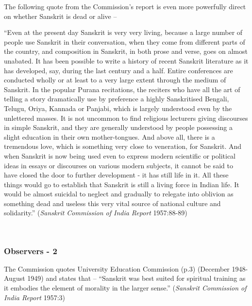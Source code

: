 The following quote from the Commission’s report is even more powerfully direct on whether Sanskrit is dead or alive  – 
\newpage

\begin{myquote}
\eleven
“Even at the present day Sanskrit is very very living, because a large number of people use Sanskrit in their conversation, when they come from different parts of the country, and composition in Sanskrit, in both prose and verse, goes on almost unabated. It has been possible to write a history of recent Sanskrit literature as it has developed, say, during the last century and a half. Entire conferences are conducted wholly or at least to a very large extent through the medium of Sanskrit. In the popular Purana recitations, the reciters who have all the art of telling a story dramatically use by preference a highly Sanskritised Bengali, Telugu, Oriya, Kannada or Panjabi, which is largely understood even by the unlettered masses. It is not uncommon to find religious lecturers giving discourses in simple Sanskrit, and they are generally understood by people possessing a slight education in their own mother-tongues. And above all, there is a tremendous love, which is something very close to veneration, for Sanskrit. And when Sanskrit is now being used even to express modern scientific or political ideas in essays or discourses on various modern subjects, it cannot be said to have closed the door to further development - it has still life in it. All these things would go to establish that Sanskrit is still a living force in Indian life. It would be almost suicidal to neglect and gradually to relegate into oblivion as something dead and useless this very vital source of national culture and solidarity.” \hfill({\sl Sanskrit Commission of India Report} 1957:88-89)
\end{myquote}

~\\[-30pt]
 
\subsubsection{Observers - 2}
\vskip -5pt
The Commission quotes University Education Commission (p.3) (December 1948- August 1949) and states that – “Sanskrit was best suited for spiritual training as it embodies the element of morality in the larger sense.” ({\sl Sanskrit Commission of India Report} 1957:3)

